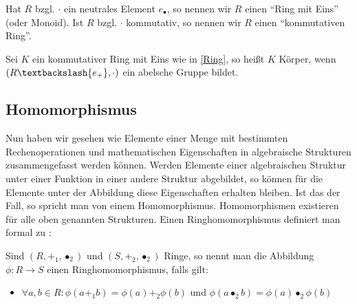 Hat $R$ bzgl. $\cdot$ ein neutrales Element $e_\bullet$, so nennen wir $R$ einen \enquote{Ring mit Eins} (oder Monoid). Ist $R$ bzgl. $\cdot$ kommutativ, so nennen wir $R$ einen \enquote{kommutativen Ring}. 

\begin{theorem}[Körper]
	Sei $K$ ein kommutativer Ring mit Eins wie in \ref{Ring}, so heißt $K$ Körper, wenn $(R\textbackslash\{e_+\},\cdot)$ ein abelsche Gruppe bildet.
	
\end{theorem}

	
		

\subsection{Homomorphismus}
\label{Homomorphismus}
Nun haben wir gesehen wie Elemente einer Menge mit bestimmten Rechenoperationen und mathematischen Eigenschaften in algebraische Strukturen zusammengefasst werden können. Werden Elemente einer algebraischen Struktur unter einer Funktion in einer andere Struktur abgebildet, so können für die Elemente unter der Abbildung diese Eigenschaften erhalten bleiben. Ist das der Fall, so spricht man von einem Homomorphismus. Homomorphismen existieren für alle oben genannten Strukturen. Einen Ringhomomorphismus definiert man formal zu \cite[p.56]{fischer2010lineare}:

\begin{theorem}[Ringhomomorphismus] 
	Sind $(R,+_1,\bullet_2)$ und $(S,+_2,\bullet_2)$ Ringe, so nennt man die Abbildung $\phi:R\rightarrow S$ einen Ringhomomorphismus, falls gilt:
	\begin{itemize}
		\item $\forall a,b\in R: \phi(a +_1 b)=\phi(a)+_2\phi(b)$ und $\phi(a \bullet_2 b)=\phi(a) \bullet_2\phi(b)$ 
	\end{itemize}
\end{theorem}

